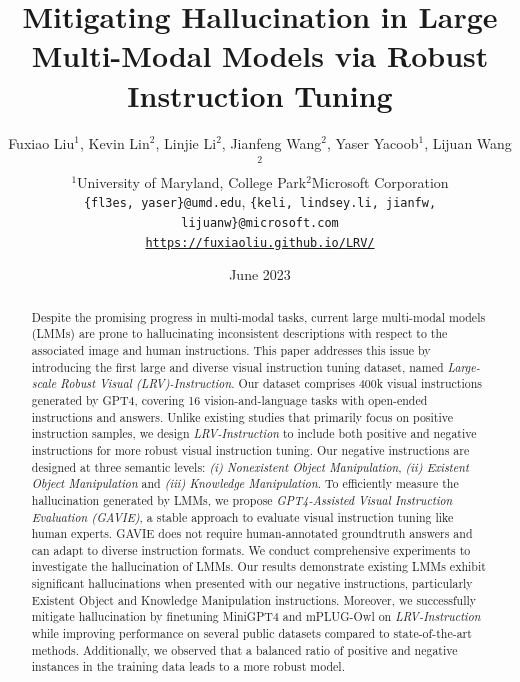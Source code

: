 \documentclass[letterpaper,10pt]{article}
\title{Mitigating Hallucination in Large Multi-Modal Models via Robust Instruction Tuning}
\author{%
 Fuxiao Liu$^1$, Kevin Lin$^2$, Linjie Li$^2$, Jianfeng Wang$^2$, Yaser Yacoob$^1$, Lijuan Wang$^2$\\ 
$^1$University of Maryland, College Park\quad $^2$Microsoft Corporation\\
\texttt{\small\{fl3es, yaser\}@umd.edu}, 
\texttt{\small\{keli, lindsey.li, jianfw, lijuanw\}@microsoft.com}\\
\texttt{\href{https://fuxiaoliu.github.io/LRV/}{https://fuxiaoliu.github.io/LRV/}}
}
\date{June 2023}
\begin{document}
\maketitle

\begin{abstract}
Despite the promising progress in multi-modal tasks, current large multi-modal models (LMMs) are prone to hallucinating inconsistent descriptions with respect to the associated image and human instructions. 
This paper addresses this issue by introducing the first large and diverse visual instruction tuning dataset, named \textit{Large-scale Robust Visual (LRV)-Instruction}.
Our dataset comprises 400k visual instructions generated by GPT4, covering 16 vision-and-language tasks with open-ended instructions and answers. 
Unlike existing studies that primarily focus on positive instruction samples, we design \textit{LRV-Instruction} to include both positive and negative instructions for more robust visual instruction tuning.
Our negative instructions are designed at three semantic levels: \textit{(i) Nonexistent Object Manipulation}, \textit{(ii) Existent Object Manipulation} and \textit{(iii) Knowledge Manipulation}. To efficiently measure the hallucination generated by LMMs, we propose \textit{GPT4-Assisted Visual Instruction Evaluation (GAVIE)}, a stable approach to evaluate visual instruction tuning like human experts. GAVIE does not require human-annotated groundtruth answers and can adapt to diverse instruction formats. We conduct comprehensive experiments to investigate the hallucination of LMMs.  
Our results demonstrate existing LMMs exhibit significant hallucinations when presented with our negative instructions, particularly Existent Object and Knowledge Manipulation instructions.
Moreover, we successfully mitigate hallucination by finetuning MiniGPT4 and mPLUG-Owl on \textit{LRV-Instruction} while improving performance on several public datasets compared to state-of-the-art methods.
Additionally, we observed that a balanced ratio of positive and negative instances in the training data leads to a more robust model.

\end{abstract}
\end{document}
